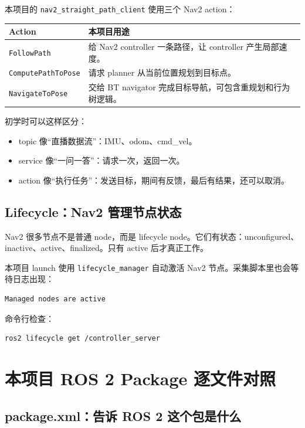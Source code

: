 \documentclass[UTF8,11pt,a4paper,openany]{ctexrep}
\newcommand{\rosnode}[1]{\nolinkurl{#1}}
\newcommand{\actionname}[1]{\nolinkurl{#1}}
\begin{document}
本项目的 \rosnode{nav2_straight_path_client} 使用三个 Nav2 action：

\begin{longtable}{L{0.28\textwidth} L{0.56\textwidth}}
\toprule
\textbf{Action} & \textbf{本项目用途} \\
\midrule
\endhead
\actionname{FollowPath} & 给 Nav2 controller 一条路径，让 controller 产生局部速度。\\
\actionname{ComputePathToPose} & 请求 planner 从当前位置规划到目标点。\\
\actionname{NavigateToPose} & 交给 BT navigator 完成目标导航，可包含重规划和行为树逻辑。\\
\bottomrule
\end{longtable}

初学时可以这样区分：

\begin{itemize}
  \item topic 像“直播数据流”：IMU、odom、cmd\_vel。
  \item service 像“一问一答”：请求一次，返回一次。
  \item action 像“执行任务”：发送目标，期间有反馈，最后有结果，还可以取消。
\end{itemize}

\section{Lifecycle：Nav2 管理节点状态}

Nav2 很多节点不是普通 node，而是 lifecycle node。它们有状态：unconfigured、inactive、active、finalized。只有 active 后才真正工作。

本项目 launch 使用 \rosnode{lifecycle_manager} 自动激活 Nav2 节点。采集脚本里也会等待日志出现：

\begin{lstlisting}[language=bash]
Managed nodes are active
\end{lstlisting}

命令行检查：

\begin{lstlisting}[language=bash]
ros2 lifecycle get /controller_server
\end{lstlisting}

\chapter{本项目 ROS 2 Package 逐文件对照}
\label{chap:project-package}

\section{package.xml：告诉 ROS 2 这个包是什么}
\end{document}
